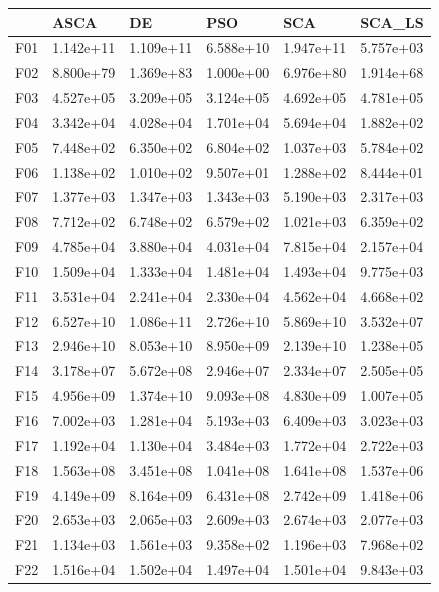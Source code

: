 \begin{tabular}{llllll}
\toprule
{} &       ASCA &         DE &        PSO &        SCA &     SCA\_LS \\
\midrule
F01  &  1.142e+11 &  1.109e+11 &  6.588e+10 &  1.947e+11 &  5.757e+03 \\
F02  &  8.800e+79 &  1.369e+83 &  1.000e+00 &  6.976e+80 &  1.914e+68 \\
F03  &  4.527e+05 &  3.209e+05 &  3.124e+05 &  4.692e+05 &  4.781e+05 \\
F04  &  3.342e+04 &  4.028e+04 &  1.701e+04 &  5.694e+04 &  1.882e+02 \\
F05  &  7.448e+02 &  6.350e+02 &  6.804e+02 &  1.037e+03 &  5.784e+02 \\
F06  &  1.138e+02 &  1.010e+02 &  9.507e+01 &  1.288e+02 &  8.444e+01 \\
F07  &  1.377e+03 &  1.347e+03 &  1.343e+03 &  5.190e+03 &  2.317e+03 \\
F08  &  7.712e+02 &  6.748e+02 &  6.579e+02 &  1.021e+03 &  6.359e+02 \\
F09  &  4.785e+04 &  3.880e+04 &  4.031e+04 &  7.815e+04 &  2.157e+04 \\
F10  &  1.509e+04 &  1.333e+04 &  1.481e+04 &  1.493e+04 &  9.775e+03 \\
F11  &  3.531e+04 &  2.241e+04 &  2.330e+04 &  4.562e+04 &  4.668e+02 \\
F12  &  6.527e+10 &  1.086e+11 &  2.726e+10 &  5.869e+10 &  3.532e+07 \\
F13  &  2.946e+10 &  8.053e+10 &  8.950e+09 &  2.139e+10 &  1.238e+05 \\
F14  &  3.178e+07 &  5.672e+08 &  2.946e+07 &  2.334e+07 &  2.505e+05 \\
F15  &  4.956e+09 &  1.374e+10 &  9.093e+08 &  4.830e+09 &  1.007e+05 \\
F16  &  7.002e+03 &  1.281e+04 &  5.193e+03 &  6.409e+03 &  3.023e+03 \\
F17  &  1.192e+04 &  1.130e+04 &  3.484e+03 &  1.772e+04 &  2.722e+03 \\
F18  &  1.563e+08 &  3.451e+08 &  1.041e+08 &  1.641e+08 &  1.537e+06 \\
F19  &  4.149e+09 &  8.164e+09 &  6.431e+08 &  2.742e+09 &  1.418e+06 \\
F20  &  2.653e+03 &  2.065e+03 &  2.609e+03 &  2.674e+03 &  2.077e+03 \\
F21  &  1.134e+03 &  1.561e+03 &  9.358e+02 &  1.196e+03 &  7.968e+02 \\
F22  &  1.516e+04 &  1.502e+04 &  1.497e+04 &  1.501e+04 &  9.843e+03 \\

\end{tabular}
